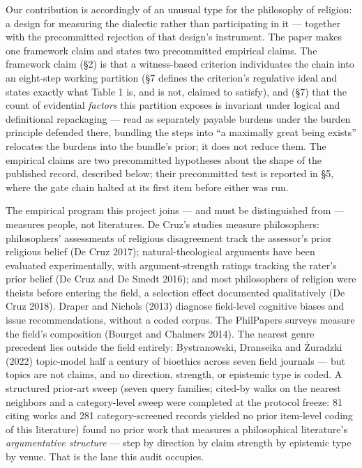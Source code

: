 Our contribution is accordingly of an unusual type for the philosophy of religion: a design for measuring the dialectic rather than participating in it --- together with the precommitted rejection of that design's instrument. The paper makes one framework claim and states two precommitted empirical claims. The framework claim (\S{}2) is that a witness-based criterion individuates the chain into an eight-step working partition (\S{}7 defines the criterion's regulative ideal and states exactly what Table 1 is, and is not, claimed to satisfy), and (\S{}7) that the count of evidential \emph{factors} this partition exposes is invariant under logical and definitional repackaging --- read as separately payable burdens under the burden principle defended there, bundling the steps into ``a maximally great being exists'' relocates the burdens into the bundle's prior; it does not reduce them. The empirical claims are two precommitted hypotheses about the shape of the published record, described below; their precommitted test is reported in \S{}5, where the gate chain halted at its first item before either was run.

The empirical program this project joins --- and must be distinguished from --- measures people, not literatures. De Cruz's studies measure philosophers: philosophers' assessments of religious disagreement track the assessor's prior religious belief (De Cruz 2017); natural-theological arguments have been evaluated experimentally, with argument-strength ratings tracking the rater's prior belief (De Cruz and De Smedt 2016); and most philosophers of religion were theists before entering the field, a selection effect documented qualitatively (De Cruz 2018). Draper and Nichols (2013) diagnose field-level cognitive biases and issue recommendations, without a coded corpus. The PhilPapers surveys measure the field's composition (Bourget and Chalmers 2014). The nearest genre precedent lies outside the field entirely: Bystranowski, Dranseika and Żuradzki (2022) topic-model half a century of bioethics across seven field journals --- but topics are not claims, and no direction, strength, or epistemic type is coded. A structured prior-art sweep (seven query families; cited-by walks on the nearest neighbors and a category-level sweep were completed at the protocol freeze: 81 citing works and 281 category-screened records yielded no prior item-level coding of this literature) found no prior work that measures a philosophical literature's \emph{argumentative structure} --- step by direction by claim strength by epistemic type by venue. That is the lane this audit occupies.

